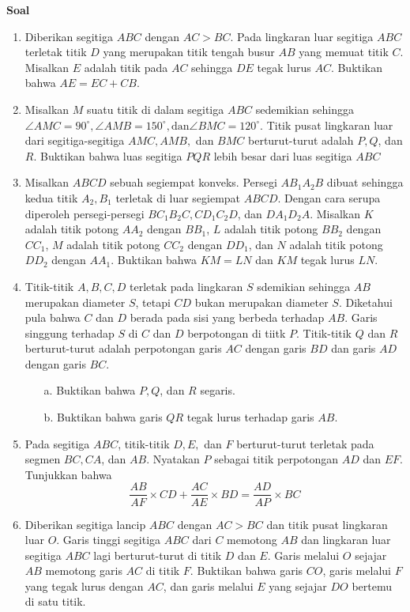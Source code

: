\documentclass{article}[12pt]
\begin{document}
	\textbf{Soal}
	\begin{enumerate}
		\item
		Diberikan segitiga $ABC$ dengan $AC>BC$. Pada lingkaran luar segitiga $ABC$ terletak titik $D$ yang merupakan titik tengah busur $AB$ yang memuat titik $C$. Misalkan $E$ adalah titik pada $AC$ sehingga $DE$ tegak lurus $AC$. Buktikan bahwa $AE=EC+CB$.
		
		\item
		Misalkan $M$ suatu titik di dalam segitiga $ABC$ sedemikian sehingga $\angle AMC = 90 ^{\circ}, \angle AMB = 150 ^{\circ}, \text{dan} \angle BMC = 120 ^\circ$. Titik pusat lingkaran luar dari segitiga-segitiga $AMC, AMB,$ dan $ BMC$ berturut-turut adalah $P,Q$, dan $R$. Buktikan bahwa luas segitiga $PQR$ lebih besar dari luas segitiga $ABC$
		
		\item
		Misalkan $ABCD$ sebuah segiempat konveks. Persegi $AB_1A_2B$ dibuat sehingga kedua titik $A_2,B_1$ terletak di luar segiempat $ABCD$. Dengan cara serupa diperoleh persegi-persegi $BC_1B_2C, CD_1C_2D$, dan $DA_1D_2A$. Misalkan $K$ adalah titik potong $AA_2$ dengan $BB_1$, $L$ adalah titik potong $BB_2$ dengan $CC_1$, $M$ adalah titik potong $CC_2$ dengan $DD_1$, dan $N$ adalah titik potong $DD_2$ dengan $AA_1$. Buktikan bahwa $KM = LN$ dan $KM$ tegak lurus $LN$.
		
		\item
		Titik-titik $A,B,C,D$ terletak pada lingkaran $S$ sdemikian sehingga $AB$ merupakan diameter $S$, tetapi $CD$ bukan merupakan diameter $S$. Diketahui pula bahwa $C$ dan $D$ berada pada sisi yang berbeda terhadap $AB$. Garis singgung terhadap $S$ di $C$ dan $D$ berpotongan di tiitk $P$. Titik-titik $Q$ dan $R$ berturut-turut adalah perpotongan garis $AC$ dengan garis $BD$ dan garis $AD$ dengan garis $BC$.
		\begin{enumerate}
			\item[a.] 
			Buktikan bahwa $P,Q$, dan $R$ segaris.
			\item[b.]
			Buktikan bahwa garis $QR$ tegak lurus terhadap garis $AB$.
		\end{enumerate}
	
		\item
		Pada segitiga $ABC$, titik-titik $D,E,$ dan $F$ berturut-turut terletak pada segmen $BC,CA$, dan $AB$. Nyatakan $P$ sebagai titik perpotongan $AD$ dan $EF$. Tunjukkan bahwa $$\frac{AB}{AF}\times CD + \frac{AC}{AE}\times BD = \frac{AD}{AP} \times BC$$
		
		\item
		Diberikan segitiga lancip $ABC$ dengan $AC > BC$ dan titik pusat lingkaran luar $O$. Garis tinggi segitiga $ABC$ dari $C$ memotong $AB$ dan lingkaran luar segitiga $ABC$ lagi berturut-turut di titik $D$ dan $E$. Garis melalui $O$ sejajar $AB$ memotong garis $AC$ di titik $F$. Buktikan bahwa garis $CO$, garis melalui $F$ yang tegak lurus dengan $AC$, dan garis melalui $E$ yang sejajar $DO$ bertemu di satu titik.
		

\end{enumerate}
\end{document}
